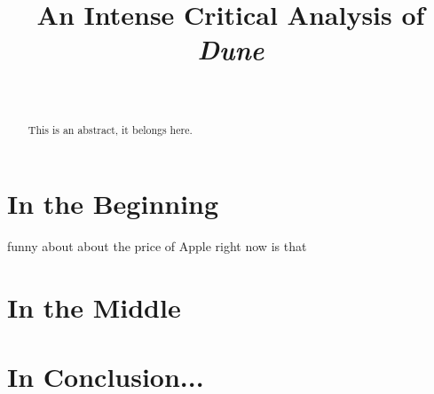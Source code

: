 \documentclass[10pt,journal,letterpaper,final]{IEEEtran}
\begin{document}
\title{An Intense Critical Analysis of \textit{Dune}}

\author{
	 \\
}

\maketitle

\begin{abstract}
This is an abstract, it belongs here. \lipsum[1]
\end{abstract}

\section{In the Beginning}

 funny about about the price of Apple \cite{black-scholes} right now \cite{didion} is that \lipsum[2]

\section{In the Middle}

\lipsum[3]

\section{In Conclusion...}

\lipsum[4]


\printbibliography

\end{document}
